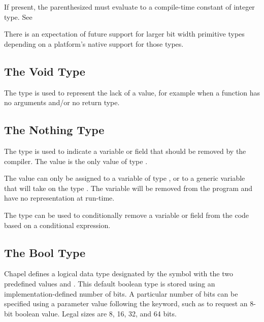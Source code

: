 If present, the parenthesized  must
evaluate to a compile-time constant of integer type.  See~

\begin{openissue}
There is an expectation of future support for larger bit width
primitive types depending on a platform's native support for those
types.
\end{openissue}

\subsection{The Void Type}
\label{The_Void_Type}

The  type is used to represent the lack of a value, for
example when a function has no arguments and/or no return type.  

\subsection{The Nothing Type}
\label{The_Nothing_type}

The  type is used to indicate a variable or field that
should be removed by the compiler. The value  is the only
value of type .

The value  can only be assigned to a variable of type
, or to a generic variable that will take on the type
. The variable will be removed from the program and
have no representation at run-time.

\begin{rationale}
The  type can be used to conditionally remove a variable
or field from the code based on a  conditional expression. 
\end{rationale}

\subsection{The Bool Type}
\label{The_Bool_Type}

Chapel defines a logical data type designated by the symbol
 with the two predefined values  and
.  This default boolean type is stored using an
implementation-defined number of bits.  A particular number of bits
can be specified using a parameter value following the 
keyword, such as  to request an 8-bit boolean value.
Legal sizes are 8, 16, 32, and 64 bits.

